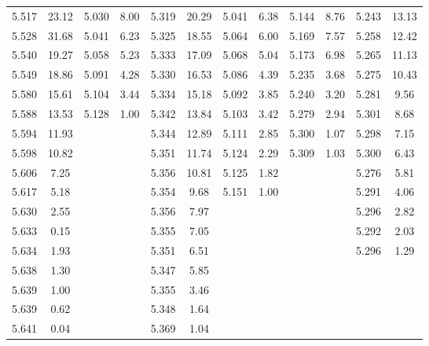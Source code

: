 \begin{table*}
\begin{tabular}{|cc|cc|cc|cc|cc|cc|}
    5.517 & 23.12 & 5.030 & 8.00 & 5.319 & 20.29 & 5.041 & 6.38 & 5.144 & 8.76 & 5.243 & 13.13 \\
    5.528 & 31.68 & 5.041 & 6.23 & 5.325 & 18.55 & 5.064 & 6.00 & 5.169 & 7.57 & 5.258 & 12.42 \\
    5.540 & 19.27 & 5.058 & 5.23 & 5.333 & 17.09 & 5.068 & 5.04 & 5.173 & 6.98 & 5.265 & 11.13 \\
    5.549 & 18.86 & 5.091 & 4.28 & 5.330 & 16.53 & 5.086 & 4.39 & 5.235 & 3.68 & 5.275 & 10.43 \\
    5.580 & 15.61 & 5.104 & 3.44 & 5.334 & 15.18 & 5.092 & 3.85 & 5.240 & 3.20 & 5.281 & 9.56 \\
    5.588 & 13.53 & 5.128 & 1.00 & 5.342 & 13.84 & 5.103 & 3.42 & 5.279 & 2.94 & 5.301 & 8.68 \\
    5.594 & 11.93 &  &  & 5.344 & 12.89 & 5.111 & 2.85 & 5.300 & 1.07 & 5.298 & 7.15 \\
    5.598 & 10.82 &  &  & 5.351 & 11.74 & 5.124 & 2.29 & 5.309 & 1.03 & 5.300 & 6.43 \\
    5.606 & 7.25 &  &  & 5.356 & 10.81 & 5.125 & 1.82 &  &  & 5.276 & 5.81 \\
    5.617 & 5.18 &  &  & 5.354 & 9.68 & 5.151 & 1.00 &  &  & 5.291 & 4.06 \\
    5.630 & 2.55 &  &  & 5.356 & 7.97 &  &  &  &  & 5.296 & 2.82 \\
    5.633 & 0.15 &  &  & 5.355 & 7.05 &  &  &  &  & 5.292 & 2.03 \\
    5.634 & 1.93 &  &  & 5.351 & 6.51 &  &  &  &  & 5.296 & 1.29 \\
    5.638 & 1.30 &  &  & 5.347 & 5.85 &  &  &  &  &  &  \\
    5.639 & 1.00 &  &  & 5.355 & 3.46 &  &  &  &  &  &  \\
    5.639 & 0.62 &  &  & 5.348 & 1.64 &  &  &  &  &  &  \\
    5.641 & 0.04 &  &  & 5.369 & 1.04 &  &  &  &  &  &  \\ \hline
    \end{tabular}
    \label{tab:in}
\end{table*}